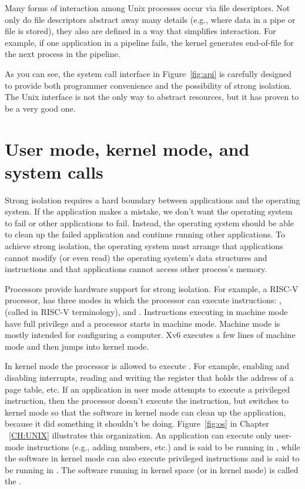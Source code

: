 Many forms of interaction among Unix processes occur via file descriptors.
Not only do file descriptors abstract away many details (e.g.,
where data in a pipe or file is stored), they also are defined in a
way that simplifies interaction.
For example, if one application in a pipeline fails, the kernel
generates end-of-file for the next process in the pipeline.

As you can see, the system call interface in
Figure~\ref{fig:api}
is carefully designed to provide both programmer convenience and
the possibility of strong isolation.  The Unix interface
is not the only way to abstract resources, but it has proven to be a very good
one.

\section{User mode, kernel mode, and system calls}

Strong isolation requires a hard boundary between applications and the operating
system.  If the application makes a mistake, we don't want the operating system
to fail or other applications to fail. Instead, the operating system should be
able to clean up the failed application and continue running other applications.
To achieve strong isolation, the operating system must arrange that applications cannot modify (or even
read) the operating system's data structures and instructions and that
applications cannot access other process's memory.

Processors provide hardware support for strong isolation.   For
example, a RISC-V processor, has three modes in which
the processor can execute instructions:
,
(called
in RISC-V terminology), and
.
Instructions executing in machine mode have full privilege and a
processor starts in machine mode.  Machine mode is mostly intended for
configuring a computer.  Xv6 executes a few lines of machine mode and
then jumps into kernel mode.

In kernel mode the processor is allowed to execute 
.
For example, enabling and disabling interrupts,  reading and writing
the register that holds the address of a page table, etc.
If an application in user mode attempts to execute
a privileged instruction, then the processor doesn't execute the instruction, but switches
to kernel mode so that the software in kernel mode can clean up the application,
because it did something it shouldn't be doing. 
Figure~\ref{fig:os}
in Chapter ~\ref{CH:UNIX} illustrates this organization.  An application can
execute only user-mode instructions (e.g., adding numbers, etc.) and is said to
be running in 
,
while the software in kernel mode can also execute privileged instructions and
is said to be running in
.
The software running in kernel space (or in kernel mode) is called
the
.

